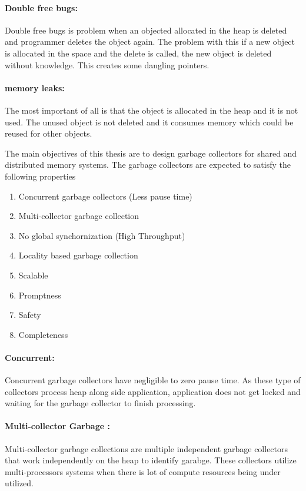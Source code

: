 \paragraph{Double free bugs:}
	Double free bugs is problem when an objected allocated in the heap is deleted and programmer deletes the object again. The problem with this if a new object is allocated in the space and the delete is called, the new object is deleted without knowledge. This creates some dangling pointers.
\paragraph{memory leaks:}
	The most important of all is that the object is allocated in the heap and it is not used. The unused object is not deleted and it consumes memory which could be reused for other objects.
	
The main objectives of this thesis are to design garbage collectors for shared and distributed memory systems. The garbage collectors are expected to satisfy the following properties
\begin{enumerate}
	\item Concurrent garbage collectors (Less pause time)
	\item Multi-collector garbage collection
	\item No global synchornization (High Throughput)
	\item Locality based garbage collection
	\item Scalable
	\item Promptness
	\item Safety
	\item Completeness
\end{enumerate}

\paragraph{Concurrent:}
	Concurrent garbage collectors have negligible to zero pause time. As these type of collectors process heap along side application, application does not get locked and waiting for the garbage collector to finish processing.
\paragraph{Multi-collector Garbage :}
	Multi-collector garbage collections are multiple independent garbage collectors that work independently on the heap to identify garabge. These collectors utilize multi-processors systems when there is lot of compute resources being under utilized.
